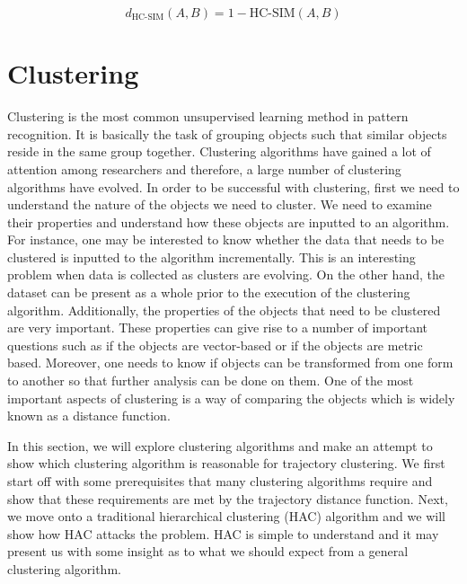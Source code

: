 \documentclass[a4paper, 12pt]{article}
\begin{document}
\begin{equation} \label{eq16}
    d_\text{HC-SIM}(A, B) = 1 - \text{HC-SIM}(A, B)
\end{equation}

\section{Clustering}
Clustering is the most common unsupervised learning method in pattern recognition. It is basically the task of grouping objects such that similar objects reside in the same group together. Clustering algorithms have gained a lot of attention among researchers and therefore, a large number of clustering algorithms have evolved. In order to be successful with clustering, first we need to understand the nature of the objects we need to cluster. We need to examine their properties and understand how these objects are inputted to an algorithm. For instance, one may be interested to know whether the data that needs to be clustered is inputted to the algorithm incrementally. This is an interesting problem when data is collected as clusters are evolving. On the other hand, the dataset can be present as a whole prior to the execution of the clustering algorithm. Additionally, the properties of the objects that need to be clustered are very important. These properties can give rise to a number of important questions such as if the objects are vector-based or if the objects are metric based. Moreover, one needs to know if objects can be transformed from one form to another so that further analysis can be done on them. One of the most important aspects of clustering is a way of comparing the objects which is widely known as a distance function. 

In this section, we will explore clustering algorithms and make an attempt to show which clustering algorithm is reasonable for trajectory clustering. We first start off with some prerequisites that many clustering algorithms require and show that these requirements are met by the trajectory distance function. Next, we move onto a traditional hierarchical clustering (HAC) algorithm and we will show how HAC attacks the problem. HAC is simple to understand and it may present us with some insight as to what we should expect from a general clustering algorithm.
\end{document}

